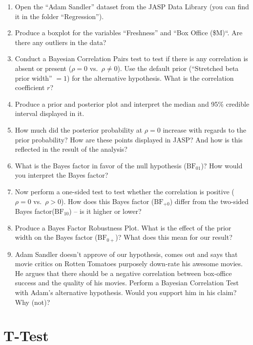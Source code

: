 \documentclass[
]{book}
\providecommand{\tightlist}{%
  \setlength{\itemsep}{0pt}\setlength{\parskip}{0pt}}
\begin{document}
\begin{enumerate}
\def\labelenumi{\arabic{enumi}.}
\tightlist
\item
  Open the ``Adam Sandler'' dataset from the JASP Data Library (you can find it in the folder ``Regression'').
\item
  Produce a boxplot for the variables ``Freshness'' and ``Box Office (\$M)``. Are there any outliers in the data?
\item
  Conduct a Bayesian Correlation Pairs test to test if there is any correlation is absent or present (\(\rho = 0\) vs.~\(\rho\neq 0\)). Use the default prior (``Stretched beta prior width'' \(= 1\)) for the alternative hypothesis. What is the correlation coefficient \(r\)?
\item
  Produce a prior and posterior plot and interpret the median and 95\% credible interval displayed in it.\\
\item
  How much did the posterior probability at \(\rho = 0\) increase with regards to the prior probability? How are these points displayed in JASP? And how is this reflected in the result of the analysis?
\item
  What is the Bayes factor in favor of the null hypothesis (\(\text{BF}_{01}\))? How would you interpret the Bayes factor?
\item
  Now perform a one-sided test to test whether the correlation is positive (\(\rho = 0\) vs.~\(\rho> 0\)). How does this Bayes factor (\(\text{BF}_{+0}\)) differ from the two-sided Bayes factor(\(\text{BF}_{10}\)) -- is it higher or lower?
\item
  Produce a Bayes Factor Robustness Plot. What is the effect of the prior width on the Bayes factor (\(\text{BF}_{0+}\))? What does this mean for our result?
\item
  Adam Sandler doesn't approve of our hypothesis, comes out and says that movie critics on Rotten Tomatoes purposely down-rate his awesome movies. He argues that there should be a negative correlation between box-office success and the quality of his movies. Perform a Bayesian Correlation Test with Adam's alternative hypothesis. Would you support him in his claim? Why (not)?
\end{enumerate}

\hypertarget{t-test}{%
\section{T-Test}\label{t-test}}
\end{document}
